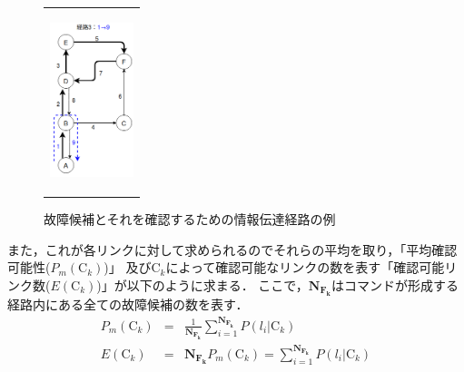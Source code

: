\documentclass[11pt]{jsarticle}%
\begin{document}
\begin{multicols}{2}
\begin{figure}[H]
\begin{tabular}{c}
\begin{minipage}{0.30\hsize}
           \label{fig:route2}
        \end{minipage}
        \begin{minipage}{0.30\hsize}
           \centering
           \includegraphics[height=4.5cm]{../figure/route3.png}
              \label{fig:route2}
           \end{minipage}
     \end{tabular} 
     \caption{故障候補とそれを確認するための情報伝達経路の例}%
     \label{fig:route}
\end{figure}
また，これが各リンクに対して求められるのでそれらの平均を取り，「平均確認可能性($P_m(\text{C}_k)$)」
及びC$_k$によって確認可能なリンクの数を表す「確認可能リンク数($E(\text{C}_k)$)」が以下のように求まる．
ここで，$\mathbf{N_{F_k}}$はコマンドが形成する経路内にある全ての故障候補の数を表す．
\begin{eqnarray}
  P_m(\text{C}_k) &=& \frac{1}{\mathbf{N_{F_k}}}\sum_{i=1}^{\mathbf{N_{F_k}}}
  P(l_i|\text{C}_k) \label{eq:Pm Ck} \\
  E(\text{C}_k) &=& \mathbf{N_{F_k}}P_m(\text{C}_k) =
   \sum_{i=1}^{\mathbf{N_{F_k}}}P(l_i|\text{C}_k) \label{eq:E Ck}
\end{eqnarray}


\end{multicols}
\end{document}
